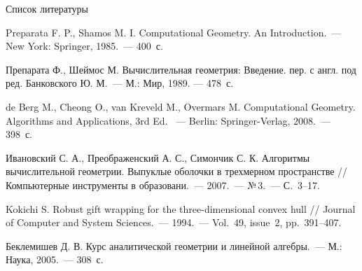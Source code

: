\documentclass[]{beamer} %
\begin{document}
\begin{frame}{Список литературы}
    \begin{thebibliography}{9}
         Preparata F. P., Shamos M. I. Computational Geometry. An Introduction.~--- New York: Springer, 1985.~--- 400~с.

         Препарата Ф., Шеймос М. Вычислительная геометрия: Введение. пер. с англ. под ред. Банковского Ю. М.~--- М.: Мир, 1989. --- 478~с.

         de Berg M., Cheong O., van Kreveld M., Overmars M. Computational Geometry. Algorithms and Applications, 3rd Ed. ~--- Berlin: Springer-Verlag, 2008.~--- 398~с.

         Ивановский С. А., Преображенский А. С., Симончик С. К. Алгоритмы вычислительной геометрии. Выпуклые оболочки в трехмерном пространстве // Компьютерные инструменты в образовани.~--- 2007.~--- №\,3.~--- С.~3--17.

         Kokichi S. Robust gift wrapping for the three-dimensional convex hull // Journal of Computer and System Sciences.~--- 1994.~--- Vol.~49, issue~2, pp.~391--407.

         Беклемишев Д. В. Курс аналитической геометрии и линейной алгебры.~--- М.: Наука, 2005.~--- 308~с.
        \end{thebibliography}
\end{frame}
\end{document}
